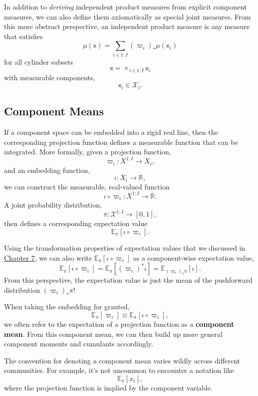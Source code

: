 \documentclass[
  letterpaper,
  DIV=11,
  numbers=noendperiod]{scrartcl}
\begin{document}
In addition to \emph{deriving} independent product measures from
explicit component measures, we can also define them axiomatically as
special joint measures. From this more abstract perspective, an
independent product measure is any measure that satisfies \[
\mu( \mathsf{x} )
=
\sum_{i \in 1:I} (\varpi_{i})_{*} \mu( \mathsf{x}_{i} )
\] for all cylinder subsets \[
\mathsf{x} = \times_{i \in 1:I} \mathsf{x}_{i}
\] with measurable components, \[
\mathsf{x}_{i} \in \mathcal{X}_{i}.
\]

\subsection{Component Means}\label{component-means}

If a component space can be embedded into a rigid real line, then the
corresponding projection function defines a measurable function that can
be integrated. More formally, given a projection function, \[
\varpi_{i} : X^{1:I} \rightarrow X_{i},
\] and an embedding function, \[
\iota : X_{i} \rightarrow \mathbb{R},
\] we can construct the measurable, real-valued function \[
\iota \circ \varpi_{i} : X^{1:I} \rightarrow \mathbb{R}.
\] A joint probability distribution, \[
\pi : \mathcal{X}^{1:I} \rightarrow [0, 1],
\] then defines a corresponding expectation value \[
\mathbb{E}_{ \pi } \! \left[  \iota \circ \varpi_{i}  \right].
\]

Using the transformation properties of expectation values that we
discussed in
\href{http://www.symplectomorphic.com/assets/chapters_html/transforming_probability_spaces.html}{Chapter
7}, we can also write
\(\mathbb{E}_{ \pi } \! \left[  \iota \circ \varpi_{i}  \right]\) as a
component-wise expectation value, \[
\mathbb{E}_{ \pi } \! \left[  \iota \circ \varpi_{i}  \right]
=
\mathbb{E}_{ \pi } \! \left[  ( \varpi_{i} )^{*} \iota  \right]
=
\mathbb{E}_{ (\varpi_{i})_{*} \pi } \! \left[  \iota  \right].
\] From this perspective, the expectation value is just the mean of the
pushforward distribution \((\varpi_{i})_{*} \pi\)!

When taking the embedding for granted, \[
\mathbb{E}_{ \pi } \! \left[  \varpi_{i}  \right]
\equiv
\mathbb{E}_{ \pi } \! \left[  \iota \circ \varpi_{i}  \right],
\] we often refer to the expectation of a projection function as a
\textbf{component mean}. From this component mean, we can then build up
more general component moments and cumulants accordingly.

The convention for denoting a component mean varies wildly across
different communities. For example, it's not uncommon to encounter a
notation like \[
\mathbb{E}_{\pi}[ x_{i} ],
\] where the projection function is implied by the component variable.
\end{document}
